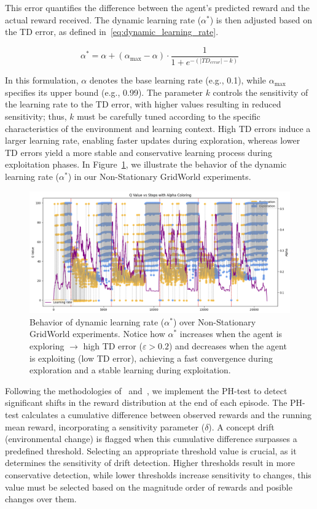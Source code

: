 This error quantifies the difference between the agent’s predicted reward and the actual reward received. The dynamic learning rate ($\alpha^*$) is then adjusted based on the TD error, as defined in~\eqref{eq:dynamic_learning_rate}.

\begin{equation}
    \label{eq:dynamic_learning_rate}
    \alpha^* = \alpha + (\alpha_{\max}-\alpha) \cdot \frac{1}{1 + e^{-(|TD_{error}|-k)}}
\end{equation}

In this formulation, $\alpha$ denotes the base learning rate (e.g., 0.1), while $\alpha_{\max}$ specifies its upper bound (e.g., 0.99). The parameter $k$ controls the sensitivity of the learning rate to the TD error, with higher values resulting in reduced sensitivity; thus, $k$ must be carefully tuned according to the specific characteristics of the environment and learning context. High TD errors induce a larger learning rate, enabling faster updates during exploration, whereas lower TD errors yield a more stable and conservative learning process during exploitation phases. In Figure~\ref{fig:alpha}, we illustrate the behavior of the dynamic learning rate ($\alpha^*$) in our Non-Stationary GridWorld experiments.

\begin{figure}
    \centering
    \includegraphics[width=\textwidth]{figures/alpha.png}
    \caption{Behavior of dynamic learning rate ($\alpha^*$) over Non-Stationary GridWorld experiments. Notice how $\alpha^*$ increases when the agent is exploring $\rightarrow$ high TD error ($\varepsilon>0.2$) and decreases when the agent is exploiting (low TD error), achieving a fast convergence during exploration and a stable learning during exploitation.}
    \label{fig:alpha}
\end{figure}

Following the methodologies of~\citet{mignon2017adaptive} and~\citet{networkdynamicrl}, we implement the PH-test to detect significant shifts in the reward distribution at the end of each episode. The PH-test calculates a cumulative difference between observed rewards and the running mean reward, incorporating a sensitivity parameter ($\delta$). A concept drift (environmental change) is flagged when this cumulative difference surpasses a predefined threshold. Selecting an appropriate threshold value is crucial, as it determines the sensitivity of drift detection. Higher thresholds result in more conservative detection, while lower thresholds increase sensitivity to changes, this value must be selected based on the magnitude order of rewards and posible changes over them.

